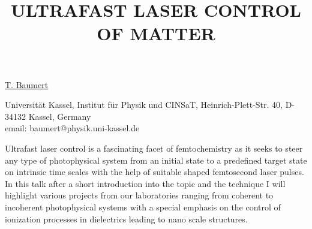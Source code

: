\title{ULTRAFAST LASER CONTROL OF MATTER}

\underline{T. Baumert}


Universit\"at Kassel, Institut f\"ur Physik und CINSaT, Heinrich-Plett-Str. 40, D-34132 Kassel, Germany\\
email: baumert@physik.uni-kassel.de

Ultrafast laser control is a fascinating facet of femtochemistry as it
seeks to steer any type of photophysical system from an initial state to
a predefined target state on intrinsic time scales with the help of
suitable shaped femtosecond laser pulses.
In this talk after a short introduction into the topic and the technique
I will highlight various projects from our laboratories ranging from
coherent to incoherent photophysical systems with a special emphasis on
the control of ionization processes in dielectrics leading to nano scale
structures.

\vspace{\baselineskip}